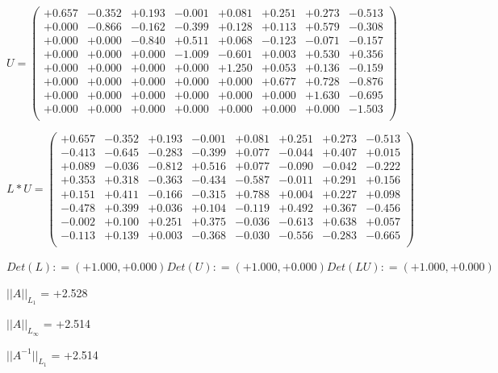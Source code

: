 \documentclass[9pt]{article}
\theoremstyle{plain}
\theoremstyle{definition}
\theoremstyle{remark}
\numberwithin{equation}{section}
\begin{document}
$U = \left(
\begin{array}{
cccccccc}
+0.657 & -0.352 & +0.193 & -0.001 & +0.081 & +0.251 & +0.273 & -0.513 \\
+0.000 & -0.866 & -0.162 & -0.399 & +0.128 & +0.113 & +0.579 & -0.308 \\
+0.000 & +0.000 & -0.840 & +0.511 & +0.068 & -0.123 & -0.071 & -0.157 \\
+0.000 & +0.000 & +0.000 & -1.009 & -0.601 & +0.003 & +0.530 & +0.356 \\
+0.000 & +0.000 & +0.000 & +0.000 & +1.250 & +0.053 & +0.136 & -0.159 \\
+0.000 & +0.000 & +0.000 & +0.000 & +0.000 & +0.677 & +0.728 & -0.876 \\
+0.000 & +0.000 & +0.000 & +0.000 & +0.000 & +0.000 & +1.630 & -0.695 \\
+0.000 & +0.000 & +0.000 & +0.000 & +0.000 & +0.000 & +0.000 & -1.503 \\
\end{array}
\right)$ \newline 

$L * U  = \left(
\begin{array}{
cccccccc}
+0.657 & -0.352 & +0.193 & -0.001 & +0.081 & +0.251 & +0.273 & -0.513 \\
-0.413 & -0.645 & -0.283 & -0.399 & +0.077 & -0.044 & +0.407 & +0.015 \\
+0.089 & -0.036 & -0.812 & +0.516 & +0.077 & -0.090 & -0.042 & -0.222 \\
+0.353 & +0.318 & -0.363 & -0.434 & -0.587 & -0.011 & +0.291 & +0.156 \\
+0.151 & +0.411 & -0.166 & -0.315 & +0.788 & +0.004 & +0.227 & +0.098 \\
-0.478 & +0.399 & +0.036 & +0.104 & -0.119 & +0.492 & +0.367 & -0.456 \\
-0.002 & +0.100 & +0.251 & +0.375 & -0.036 & -0.613 & +0.638 & +0.057 \\
-0.113 & +0.139 & +0.003 & -0.368 & -0.030 & -0.556 & -0.283 & -0.665 \\
\end{array}
\right)$ \newline 

$Det(L) :    = (+1.000,+0.000)     Det(U) :    = (+1.000,+0.000)     Det(LU) :    = (+1.000,+0.000)$

$||A||_{L_1}$  = +2.528

$||A||_{L_{\infty}}$ = +2.514

$||A^{-1}||_{L_1}$  = +2.514
\end{document}
